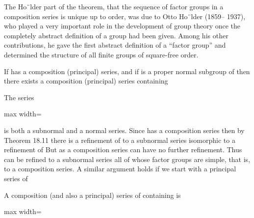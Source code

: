 \documentclass[11pt,oneside]{article}
\begin{document}
\begin{BookBody}
The Ho¨lder part of the theorem, that the sequence of factor groups in a composition series is unique up to order, was due to Otto Ho¨lder (1859– 1937), who played a very important role in the development of group theory once the completely abstract definition of a group had been given. Among his other contributions, he gave the first abstract definition of a “factor group” and determined the structure of all finite groups of square-free order.

 If  has a composition (principal) series, and if  is a proper normal subgroup of  then there exists a composition (principal) series containing 

 The series

\begin{center}\begin{adjustbox}{max width=\linewidth}\end{adjustbox}\end{center}

\noindent is both a subnormal and a normal series. Since  has a composition series  then by Theorem 18.11 there is a refinement of  to a subnormal series isomorphic to a refinement of  But as a composition series can have no further refinement. Thus  can be refined to a subnormal series all of whose factor groups are simple, that is, to a composition series. A similar argument holds if we start with a principal series  of \BookEnd{\blacklozenge}

 A composition (and also a principal) series of  containing  is

\begin{center}\begin{adjustbox}{max width=\linewidth}\end{adjustbox}\end{center} \BookEnd{\blacktriangle}

\end{BookBody}
\end{document}
